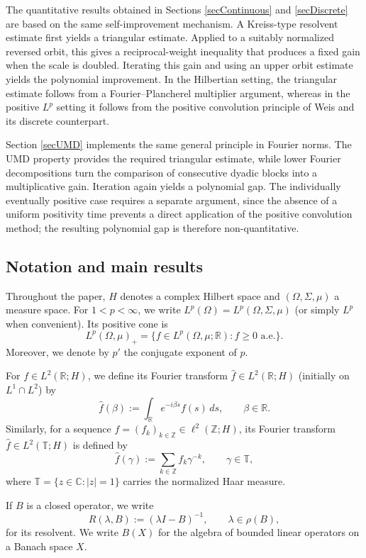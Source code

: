 \documentclass[12pt]{amsart}
\theoremstyle{plain}
\theoremstyle{remark}
\theoremstyle{definition}
\newcommand{\R}{\mathbb{R}}
\newcommand{\Z}{\mathbb{Z}}
\newcommand{\T}{\mathbb{T}}
\begin{document}
	The quantitative results obtained in Sections \ref{secContinuous} and
	\ref{secDiscrete} are based on the same self-improvement mechanism. A
	Kreiss-type resolvent estimate first yields a triangular estimate. Applied to
	a suitably normalized reversed orbit, this gives a reciprocal-weight
	inequality that produces a fixed gain when the scale is doubled. Iterating
	this gain and using an upper orbit estimate yields the polynomial improvement.
	In the Hilbertian setting, the triangular estimate follows from a
	Fourier--Plancherel multiplier argument, whereas in the positive $L^p$
	setting it follows from the positive convolution principle of Weis and its
	discrete counterpart.
	
	Section \ref{secUMD} implements the same general principle in Fourier norms.
	The UMD property provides the required triangular estimate, while lower
	Fourier decompositions turn the comparison of consecutive dyadic blocks into
	a multiplicative gain. Iteration again yields a polynomial gap. The
	individually eventually positive case requires a separate argument, since the
	absence of a uniform positivity time prevents a direct application of the
	positive convolution method; the resulting polynomial gap is therefore
	non-quantitative.
	
	
	\subsection*{Notation and main results}
	
	Throughout the paper, $H$ denotes a complex Hilbert space and $(\Omega, \Sigma, \mu)$ a measure space. For $1 < p < \infty$, we write $L^p(\Omega) = L^p(\Omega, \Sigma, \mu)$ (or simply $L^p$ when convenient). Its positive cone is
	\[
	L^p(\Omega,\mu)_+
	=
	\{f\in L^p(\Omega,\mu;\mathbb R): f\ge0 \text{ a.e.}\}.
	\] Moreover, we denote by $p'$ the conjugate exponent of $p$.
	
	For $f \in L^2(\R;H)$, we define its Fourier transform $\widehat f \in L^2(\R;H)$ (initially on $L^1\cap L^2$) by
	\[
	\widehat f(\beta) := \int_{\R} e^{-i\beta s} f(s) \, ds, \qquad \beta \in \R.
	\]
	Similarly, for a sequence $f = (f_k)_{k\in\Z} \in \ell^2(\Z;H)$, its Fourier transform $\widehat f \in L^2(\T;H)$ is defined by
	\[
	\widehat f(\gamma) := \sum_{k\in\Z} f_k \gamma^{-k}, \qquad \gamma \in \T,
	\]
	where $\T = \{z \in \mathbb{C} : |z| = 1\}$ carries the normalized Haar measure.
	
	If $B$ is a closed operator, we write
	\[
	R(\lambda,B):=(\lambda I-B)^{-1},\qquad \lambda\in\rho(B),
	\]
	for its resolvent. We write $B(X)$ for the algebra of bounded linear operators on a Banach space $X$.
	
\end{document}
